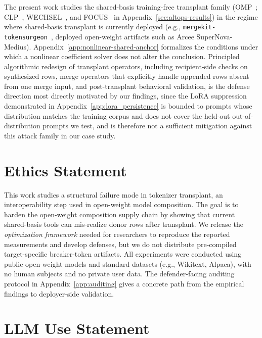 \documentclass{article}
\theoremstyle{plain}
\theoremstyle{definition}
\theoremstyle{remark}
\begin{document}
The present work studies the shared-basis training-free transplant family (OMP~\citep{goddard2025tftransplant}; CLP~\citep{ostendorff2023efficient}, WECHSEL~\citep{minixhofer2021wechsel}, and FOCUS~\citep{dobler2023focus} in Appendix~\ref{sec:altops-results}) in the regime where shared-basis transplant is currently deployed (e.g., \texttt{mergekit-tokensurgeon}~\citep{mergekit2024}, deployed open-weight artifacts such as Arcee SuperNova-Medius). Appendix~\ref{app:nonlinear-shared-anchor} formalizes the conditions under which a nonlinear coefficient solver does not alter the conclusion. Principled algorithmic redesign of transplant operators, including recipient-side checks on synthesized rows, merge operators that explicitly handle appended rows absent from one merge input, and post-transplant behavioral validation, is the defense direction most directly motivated by our findings, since the LoRA suppression demonstrated in Appendix~\ref{app:lora_persistence} is bounded to prompts whose distribution matches the training corpus and does not cover the held-out out-of-distribution prompts we test, and is therefore not a sufficient mitigation against this attack family in our case study.





\section*{Ethics Statement}



This work studies a structural failure mode in tokenizer transplant, an interoperability step used in open-weight model composition. The goal is to harden the open-weight composition supply chain by showing that current shared-basis tools can mis-realize donor rows after transplant. We release the \textit{optimization framework} needed for researchers to reproduce the reported measurements and develop defenses, but we do not distribute pre-compiled target-specific breaker-token artifacts. All experiments were conducted using public open-weight models and standard datasets (e.g., Wikitext, Alpaca), with no human subjects and no private user data. The defender-facing auditing protocol in Appendix~\ref{app:auditing} gives a concrete path from the empirical findings to deployer-side validation.


\section*{LLM Use Statement}
\end{document}
